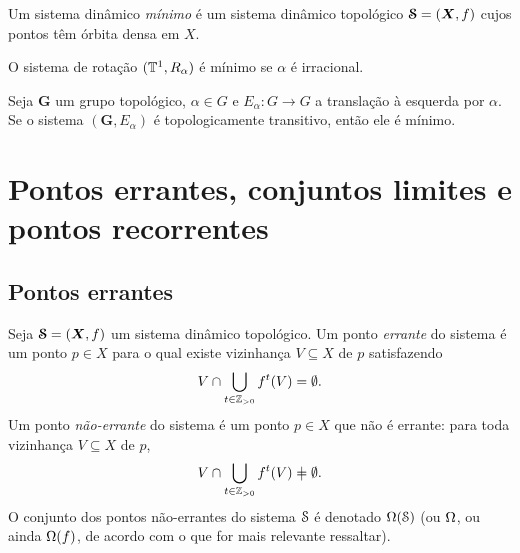 \begin{definition}
Um sistema dinâmico \emph{mínimo} é um sistema dinâmico topológico $\bm{\mathcal{S}}=(\bm X,f)$ cujos pontos têm órbita densa em $X$.
\end{definition}




\begin{proposition}
O sistema de rotação $(\mathbb{T}^1,R_\alpha)$ é mínimo se $\alpha$ é irracional.
\end{proposition}



\begin{proposition}
Seja $\bm G$ um grupo topológico, $\alpha \in G$ e $E_\alpha\colon G \to G$ a translação à esquerda por $\alpha$. Se o sistema $(\bm G, E_\alpha)$ é topologicamente transitivo, então ele é mínimo.
\end{proposition}



\section{Pontos errantes, conjuntos limites e pontos recorrentes}


\subsection{Pontos errantes}

\begin{definition}
Seja $\bm{\mathcal{S}}=(\bm X,f)$ um sistema dinâmico topológico. Um ponto \emph{errante} do sistema é um ponto $p \in X$ para o qual existe vizinhança $V \subseteq X$ de $p$ satisfazendo
	\begin{equation*}
	V \cap \bigcup_{t \in \mathbb{Z}_{>0}}f^t(V) = \emptyset.
	\end{equation*}
Um ponto \emph{não-errante} do sistema é um ponto $p \in X$ que não é errante: para toda vizinhança $V \subseteq X$ de $p$,
	\begin{equation*}
	V \cap \bigcup_{t \in \Z_{>0}}f^t(V) \neq \emptyset.
	\end{equation*}
O conjunto dos pontos não-errantes do sistema $\mathcal{S}$ é denotado $\Omega(\mathcal{S})$ (ou $\Omega$, ou ainda $\Omega(f)$, de acordo com o que for mais relevante ressaltar).
\end{definition}


